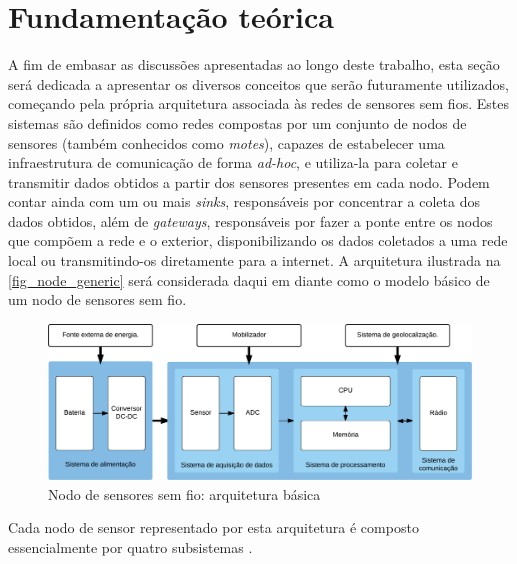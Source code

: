 \documentclass[
	12pt,				%
	openright,			%
	oneside,
	a4paper,			%
	english,			%
	french,				%
	spanish,			%
	brazil				%
	]{abntex2}
\begin{document}
\chapter{Fundamentação teórica}\label{chap_fund_teor}
A fim de embasar as discussões apresentadas ao longo deste trabalho, esta seção será dedicada a apresentar os diversos conceitos que serão futuramente utilizados, começando pela própria arquitetura associada às redes de sensores sem fios. Estes sistemas são definidos como redes compostas por um conjunto de nodos de sensores (também conhecidos como \textit{motes}), capazes de estabelecer uma infraestrutura de comunicação de forma \textit{ad-hoc}, e utiliza-la para coletar e transmitir dados obtidos a partir dos sensores presentes em cada nodo. Podem contar ainda com um ou mais \textit{sinks}, responsáveis por concentrar a coleta dos dados obtidos, além de \textit{gateways}, responsáveis por fazer a ponte entre os nodos que compõem a rede e o exterior, disponibilizando os dados coletados a uma rede local ou transmitindo-os diretamente para a internet. A arquitetura ilustrada na \autoref{fig_node_generic} será considerada daqui em diante como o modelo básico de um nodo de sensores sem fio. 

\begin{figure}[htb]
	\caption{\label{fig_node_generic}Nodo de sensores sem fio: arquitetura básica}
	\begin{center}
		\includegraphics[width=\linewidth]{SensorNode_Generic}
	\end{center}
\end{figure}

Cada nodo de sensor representado por esta arquitetura é composto essencialmente por quatro subsistemas \cite{Akyildiz2002, Rawat2014}.
\end{document}

